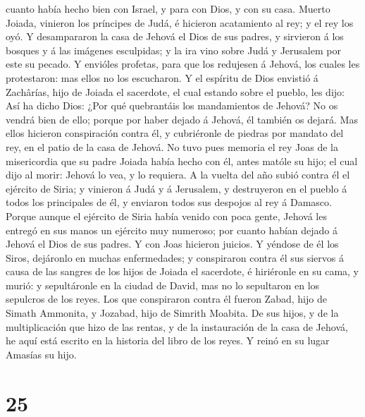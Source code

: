cuanto había hecho bien con Israel, y para con Dios, y con su casa.
 Muerto Joiada, vinieron los príncipes de Judá, é hicieron
acatamiento al rey; y el rey los oyó.  Y desampararon la
casa de Jehová el Dios de sus padres, y sirvieron á los bosques y á las
imágenes esculpidas; y la ira vino sobre Judá y Jerusalem por este su
pecado.  Y envióles profetas, para que los redujesen á
Jehová, los cuales les protestaron: mas ellos no los escucharon.
 Y el espíritu de Dios envistió á Zachârías, hijo de Joiada
el sacerdote, el cual estando sobre el pueblo, les dijo: Así ha dicho
Dios: ¿Por qué quebrantáis los mandamientos de Jehová? No os vendrá bien
de ello; porque por haber dejado á Jehová, él también os dejará.
 Mas ellos hicieron conspiración contra él, y cubriéronle
de piedras por mandato del rey, en el patio de la casa de Jehová.
 No tuvo pues memoria el rey Joas de la misericordia que su
padre Joiada había hecho con él, antes matóle su hijo; el cual dijo al
morir: Jehová lo vea, y lo requiera.  A la vuelta del año
subió contra él el ejército de Siria; y vinieron á Judá y á Jerusalem, y
destruyeron en el pueblo á todos los principales de él, y enviaron todos
sus despojos al rey á Damasco.  Porque aunque el ejército
de Siria había venido con poca gente, Jehová les entregó en sus manos un
ejército muy numeroso; por cuanto habían dejado á Jehová el Dios de sus
padres. Y con Joas hicieron juicios.  Y yéndose de él los
Siros, dejáronlo en muchas enfermedades; y conspiraron contra él sus
siervos á causa de las sangres de los hijos de Joiada el sacerdote, é
hiriéronle en su cama, y murió: y sepultáronle en la ciudad de David,
mas no lo sepultaron en los sepulcros de los reyes.  Los
que conspiraron contra él fueron Zabad, hijo de Simath Ammonita, y
Jozabad, hijo de Simrith Moabita.  De sus hijos, y de la
multiplicación que hizo de las rentas, y de la instauración de la casa
de Jehová, he aquí está escrito en la historia del libro de los reyes. Y
reinó en su lugar Amasías su hijo.

\hypertarget{section-24}{%
\section{25}\label{section-24}}

